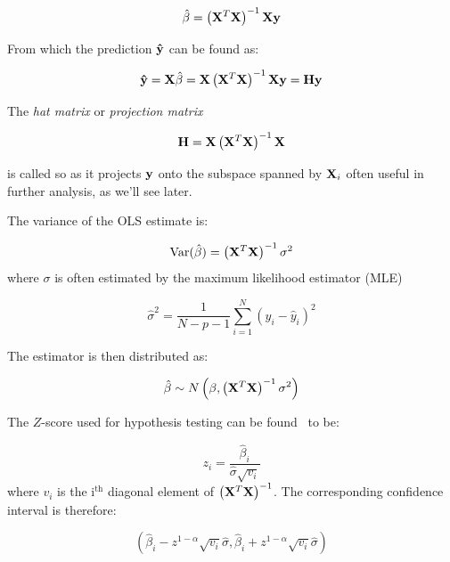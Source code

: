 \begin{equation*}
  \hat\beta = \left(\vb{X}^{T}\vb{X}\right)^{-1}\vb{X}\vb{y}
\end{equation*}

From which the prediction \(\vb{\hat y}\) can be found as:

\begin{equation*}
  \vb{\hat y} = \vb{X}\hat\beta = \vb{X}\left(\vb{X}^{T}\vb{X}\right)^{-1}\vb{X}\vb{y} = \vb{H}\vb{y}
\end{equation*}

The \textit{hat matrix} or \textit{projection matrix}

\begin{equation*}
  \vb{H} =\vb{X}\left(\vb{X}^{T}\vb{X}\right)^{-1}\vb{X} 
\end{equation*}

is called so as it
projects \(\vb{y}\) onto the subspace spanned by \(\vb{X}_{i}\)
often useful in further analysis, as we'll see later.

The variance of the OLS estimate is:

\begin{equation*}
  \text{Var}(\hat\beta) = \left( \vb{X}^{T}\vb{X} \right)^{-1}\sigma^{2}
\end{equation*}
where \(\sigma\) is often estimated by the maximum likelihood estimator (MLE)

\begin{equation*}
  \hat\sigma^{2} = \frac{1}{N-p-1}\sum_{i=1}^{N}\left( y_{i} - \hat y_{i} \right)^{2}
\end{equation*}

The estimator is then distributed as:

\begin{equation*}
\hat\beta \sim N\left( \beta, \left( \vb{X}^{T}\vb{X} \right)^{-1}\sigma^{2} \right)
\end{equation*}

The \(Z\)-score used for hypothesis testing can be found~\cite{statelem} to be:

\begin{equation*}
  z_{i} = \frac{\hat\beta_{i}}{\hat\sigma\sqrt{v_{i}}}
\end{equation*}
where \(v_{i}\) is the \(\text{i}^{\text{th}}\) diagonal element of \(\left( \vb{X}^{T}\vb{X} \right)^{-1}\).
The corresponding confidence interval is therefore:

\begin{equation*}
  \left( \hat\beta_{i} - z^{1-\alpha}\sqrt{v_{i}}\hat\sigma,  \hat\beta_{i} + z^{1-\alpha}\sqrt{v_{i}}\hat\sigma\right)
\end{equation*}


